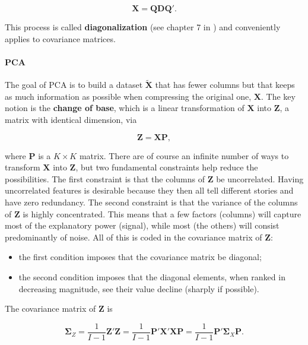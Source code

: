 \begin{equation}
\label{eq:diagonaliz}
\textbf{X}=\textbf{Q}\textbf{DQ}'.
\end{equation}

This process is called \textbf{diagonalization} (see chapter 7 in \cite{meyer2000matrix}) and conveniently applies to covariance matrices.

\paragraph{PCA}

The goal of PCA is to build a dataset $\tilde{\textbf{X}}$ that has fewer columns but that keeps as much information as possible when compressing the original one, $\textbf{X}$. The key notion is the \textbf{change of base}, which is a linear transformation of $\textbf{X}$ into $\textbf{Z}$, a matrix with identical dimension, via

\begin{equation}
\label{eq:pca}
\textbf{Z}=\textbf{XP},
\end{equation}

where $\textbf{P}$ is a $K \times K$ matrix. There are of course an infinite number of ways to transform $\textbf{X}$ into $\textbf{Z}$, but two fundamental constraints help reduce the possibilities. The first constraint is that the columns of $\textbf{Z}$ be uncorrelated. Having uncorrelated features is desirable because they then all tell different stories and have zero redundancy. The second constraint is that the variance of the columns of $\textbf{Z}$ is highly concentrated. This means that a few factors (columns) will capture most of the explanatory power (signal), while most (the others) will consist predominantly of noise. All of this is coded in the covariance matrix of $\textbf{Z}$:

\begin{itemize}
\item the first condition imposes that the covariance matrix be diagonal;
\item the second condition imposes that the diagonal elements, when ranked in decreasing magnitude, see their value decline (sharply if possible).
\end{itemize}

The covariance matrix of $\textbf{Z}$ is

\begin{equation}
\label{eq:covy}
\boldsymbol{\Sigma}_Z=\frac{1}{I-1}\textbf{Z}'\textbf{Z}=\frac{1}{I-1}\textbf{P}'\textbf{X}'\textbf{XP}=\frac{1}{I-1}\textbf{P}'\boldsymbol{\Sigma}_X\textbf{P}.
\end{equation}

